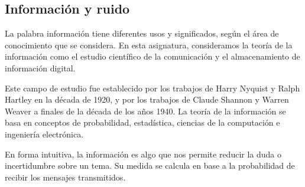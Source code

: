\subsection{Información y ruido}

La palabra información tiene diferentes usos y significados, según el área de conocimiento que se considera. En esta asignatura, consideramos la teoría de la información como el estudio científico de la comunicación y el almacenamiento de información digital.

Este campo de estudio fue establecido por los trabajos de Harry Nyquist y Ralph Hartley en la década de 1920, y por los trabajos de Claude Shannon y Warren Weaver a finales de la década de los años 1940. La teoría de la información se basa en conceptos de probabilidad, estadística, ciencias de la computación e ingeniería electrónica.

En forma intuitiva, la información es algo que nos permite reducir la duda o incertidumbre sobre un tema. Su medida se calcula en base a la probabilidad de recibir los mensajes transmitidos.

